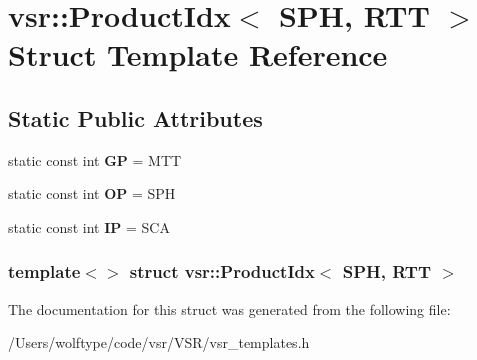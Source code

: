 \hypertarget{structvsr_1_1_product_idx_3_01_s_p_h_00_01_r_t_t_01_4}{\section{vsr\-:\-:Product\-Idx$<$ S\-P\-H, R\-T\-T $>$ Struct Template Reference}
\label{structvsr_1_1_product_idx_3_01_s_p_h_00_01_r_t_t_01_4}
}
\subsection*{Static Public Attributes}
\begin{DoxyCompactItemize}
\item 
\hypertarget{structvsr_1_1_product_idx_3_01_s_p_h_00_01_r_t_t_01_4_affd2e1b0a51c4b00c9970c45ede999c8}{static const int {\bfseries G\-P} = M\-T\-T}\label{structvsr_1_1_product_idx_3_01_s_p_h_00_01_r_t_t_01_4_affd2e1b0a51c4b00c9970c45ede999c8}

\item 
\hypertarget{structvsr_1_1_product_idx_3_01_s_p_h_00_01_r_t_t_01_4_aebc440ba9061004b2ad9e7b3308fcbf4}{static const int {\bfseries O\-P} = S\-P\-H}\label{structvsr_1_1_product_idx_3_01_s_p_h_00_01_r_t_t_01_4_aebc440ba9061004b2ad9e7b3308fcbf4}

\item 
\hypertarget{structvsr_1_1_product_idx_3_01_s_p_h_00_01_r_t_t_01_4_a95d024aecc10fe64ca5219e51dc11388}{static const int {\bfseries I\-P} = S\-C\-A}\label{structvsr_1_1_product_idx_3_01_s_p_h_00_01_r_t_t_01_4_a95d024aecc10fe64ca5219e51dc11388}

\end{DoxyCompactItemize}
\subsubsection*{template$<$$>$ struct vsr\-::\-Product\-Idx$<$ S\-P\-H, R\-T\-T $>$}



The documentation for this struct was generated from the following file\-:\begin{DoxyCompactItemize}
\item 
/\-Users/wolftype/code/vsr/\-V\-S\-R/vsr\-\_\-templates.\-h\end{DoxyCompactItemize}
